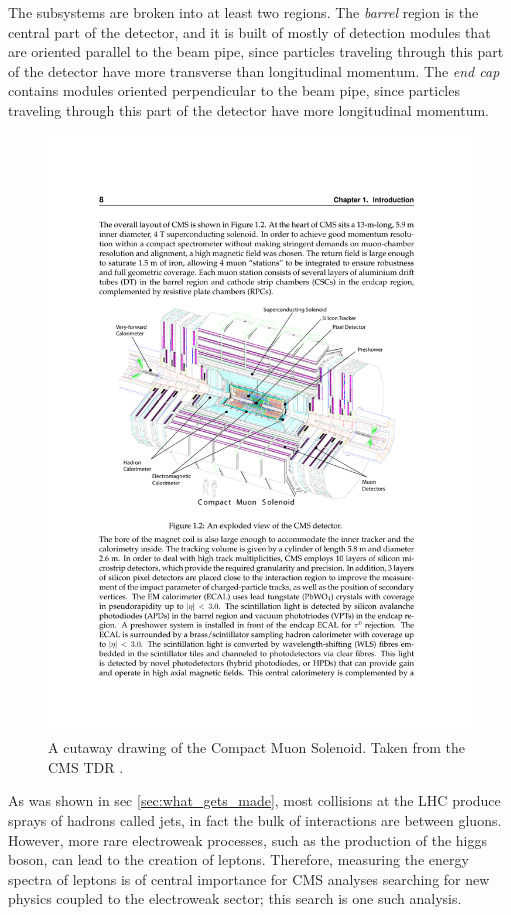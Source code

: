   The subsystems are broken into at least two regions. The \emph{barrel} region is the central part of the detector, and it is built of mostly of detection modules that are oriented parallel to the beam pipe, since particles traveling through this part of the detector have more transverse than longitudinal momentum. The \emph{end cap} contains modules oriented perpendicular to the beam pipe, since particles traveling through this part of the detector have more longitudinal momentum.

  \begin{figure}[h!]
    \centering
    \includegraphics[width=.7\textwidth]{figures/cms_detector.pdf}
    \caption{A cutaway drawing of the Compact Muon Solenoid. Taken from the CMS TDR \cite{cms_tdr}.}
    \label{fig:cms_detector}
  \end{figure}

  As was shown in sec \ref{sec:what_gets_made}, most collisions at the LHC produce sprays of hadrons called jets, in fact the bulk of interactions are between gluons. However, more rare electroweak processes, such as the production of the higgs boson, can lead to the creation of leptons. Therefore, measuring the energy spectra of leptons is of central importance for CMS analyses searching for new physics coupled to the electroweak sector; this search is one such analysis. 


